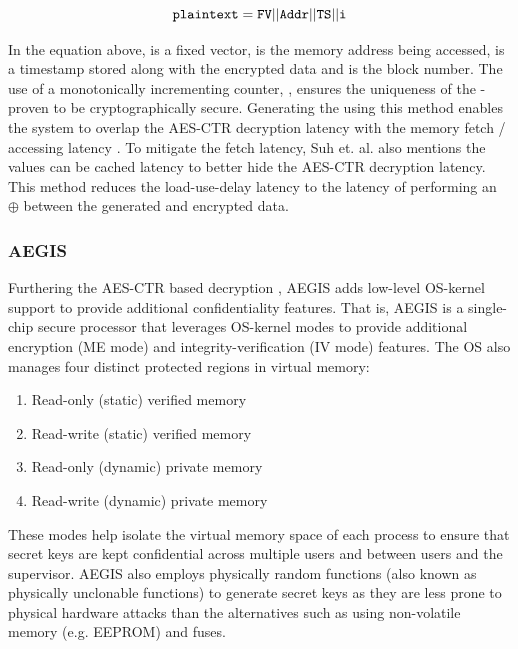 $$\texttt{plaintext} = {\texttt{FV} || \texttt{Addr} || \texttt{TS} || \texttt{i}}$$

In the equation above,  is a fixed vector,  is the memory
address being accessed,  is a timestamp stored along with the encrypted
data and  is the block number.  The use of a monotonically incrementing
counter, , ensures the uniqueness of the  - proven to be
cryptographically secure. Generating the  using this method enables the
system to overlap the AES-CTR decryption latency with the memory fetch /
accessing latency \cite{suh-memIntEnc}. To mitigate the fetch latency, Suh et.
al. also mentions the  values can be cached latency to better hide the
AES-CTR decryption latency. This method reduces the load-use-delay latency to
the latency of performing an $\oplus$ between the generated  and
encrypted data.

\subsubsection{AEGIS}
Furthering the AES-CTR based decryption \cite{suh-memIntEnc}, AEGIS
\cite{aegis} adds low-level OS-kernel support to provide additional
confidentiality features. That is, AEGIS is a single-chip secure processor that
leverages OS-kernel modes to provide additional encryption (ME mode) and
integrity-verification (IV mode) features. The OS also manages four distinct
protected regions in virtual memory:

\begin{enumerate}[noitemsep, topsep=0pt]
    \item Read-only (static) verified memory
    \item Read-write (static) verified memory
    \item Read-only (dynamic) private memory
    \item Read-write (dynamic) private memory
\end{enumerate}

These modes help isolate the virtual memory space of each process to ensure
that secret keys are kept confidential across multiple users and between users
and the supervisor. AEGIS also employs physically random functions (also known
as physically unclonable functions) to generate secret keys as they are less
prone to physical hardware attacks than the alternatives such as using
non-volatile memory (e.g. EEPROM) and fuses.

